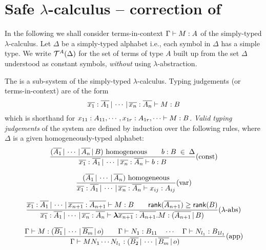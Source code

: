 \documentclass{article}
\newcommand\rank[1]{{\sf rank}(#1)}
\begin{document}
\section{Safe $\lambda$-calculus -- correction of \cite{DBLP:conf/fossacs/AehligMO05}}

In the following we shall consider terms-in-context ${{\Gamma} \vdash {M
: A}}$ of the simply-typed $\lambda$-calculus. Let $\Delta$ be a
simply-typed alphabet i.e., each symbol in $\Delta$ has a simple
type. We write ${\cal T}^{A}(\Delta)$ for the set of terms of type $A$
built up from the set $\Delta$ understood as constant symbols,
\emph{without} using $\lambda$-abstraction.


The  is a sub-system of the
simply-typed $\lambda$-calculus. Typing judgements (or
terms-in-context) are of the form
\begin{equation}
\nonumber {{\overline{x_1}:\overline{A_1} \, | \, \cdots \, | \,
\overline{x_n} :  \overline{A_n}} \vdash {M : B}}
\end{equation}
which is shorthand for ${{x_{11} : A_{11}, \cdots, x_{1r}:
A_{1r}, \cdots} \vdash {M : B}}$. \emph{Valid typing judgements} of the
system are defined by induction over the following rules, where
$\Delta$ is a given homogeneously-typed alphabet:
\[{{(\overline{A_1} \, | \, \cdots \, | \, \overline{A_n} \, | \, B)
\hbox{ homogeneous} \qquad {b : B} \; \in \; \Delta} \over
{{{\overline{x_1} : \overline{A_1}\, | \, \cdots\, | \,
\overline{x_n} : \overline{A_n}} \vdash {b : B}}}}(\mbox{const})\]

\[{{(\overline{A_1}
\, | \, \cdots \, | \, \overline{A_n}) \hbox{ homogeneous}} \over
{{{\overline{x_1} : \overline{A_1}\, | \, \cdots\, | \,
\overline{x_n} : \overline{A_n}} \vdash {x_{ij} : A_{ij}}}}}(\mbox{var})\]

\[
{ {\seq{\overline{x_1} : \overline{A_1}\, | \, \cdots\, | \,
\overline{x_{n+1}} : \overline{A_{n+1}}}{M : B}} \qquad
\rank{\overline{A_{n+1}}} \geq \rank{B} \over {\seq{\overline{x_1} :
\overline{A_1}\, | \, \cdots\, | \, \overline{x_{n}} :
\overline{A_{n}}}{\lterm{\overline{x_{n+1}} : \overline{A_{n+1}}}{M}
: (\overline{A_{n+1}} \, | \, B)}} } (\mbox{$\lambda$-abs})\]

\[ {{{{\Gamma} \vdash {M : (\overline{B_1} \, | \, \cdots \, | \, \overline{B_m} \, | \, o)}} \qquad
{{\Gamma} \vdash {N_1 : B_{11}}} \quad \cdots \quad {{\Gamma} \vdash {N_{l_1} :
B_{1l_1}}} }\over{ {{\Gamma} \vdash {M N_1 \cdots N_{l_1} :
(\overline{B_2} \, | \, \cdots \, | \, \overline{B_m} \, | \, o)}}}}
(\mbox{app})\]
\end{document}
